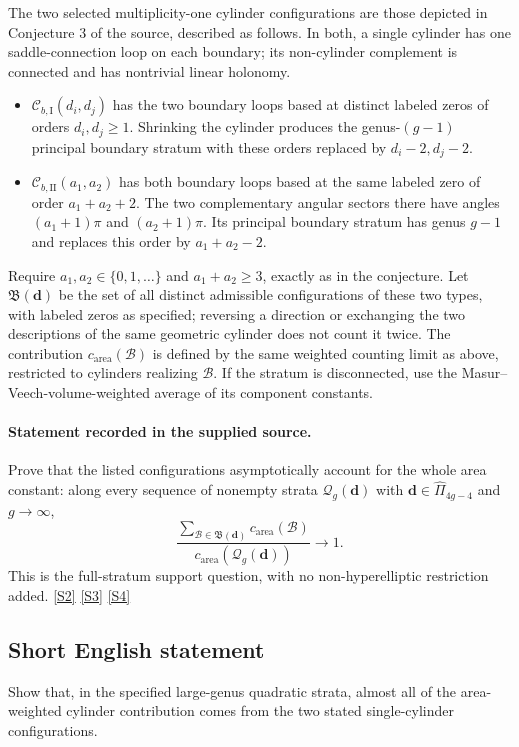 \documentclass[11pt]{article}
\newcommand{\sref}[2]{\hyperlink{source:#1:#2}{[S#2]}}
\begin{document}
The two selected multiplicity-one cylinder configurations are those depicted in Conjecture 3 of the source, described as follows. In both, a single cylinder has one saddle-connection loop on each boundary; its non-cylinder complement is connected and has nontrivial linear holonomy.
\begin{itemize}
\item $\mathcal C_{b,\mathrm I}(d_i,d_j)$ has the two boundary loops based at distinct labeled zeros of orders $d_i,d_j\ge1$. Shrinking the cylinder produces the genus-$(g-1)$ principal boundary stratum with these orders replaced by $d_i-2,d_j-2$.
\item $\mathcal C_{b,\mathrm{II}}(a_1,a_2)$ has both boundary loops based at the same labeled zero of order $a_1+a_2+2$. The two complementary angular sectors there have angles $(a_1+1)\pi$ and $(a_2+1)\pi$. Its principal boundary stratum has genus $g-1$ and replaces this order by $a_1+a_2-2$.
\end{itemize}
Require $a_1,a_2\in\{0,1,\ldots\}$ and $a_1+a_2\ge3$, exactly as in the conjecture. Let $\mathfrak B(\boldsymbol d)$ be the set of all distinct admissible configurations of these two types, with labeled zeros as specified; reversing a direction or exchanging the two descriptions of the same geometric cylinder does not count it twice. The contribution $c_{\mathrm{area}}(\mathcal B)$ is defined by the same weighted counting limit as above, restricted to cylinders realizing $\mathcal B$. If the stratum is disconnected, use the Masur--Veech-volume-weighted average of its component constants.
\paragraph{Statement recorded in the supplied source.}
Prove that the listed configurations asymptotically account for the whole area constant: along every sequence of nonempty strata $\mathcal Q_g(\boldsymbol d)$ with $\boldsymbol d\in\widehat\Pi_{4g-4}$ and $g\to\infty$,
\[
 \frac{\displaystyle\sum_{\mathcal B\in\mathfrak B(\boldsymbol d)}c_{\mathrm{area}}(\mathcal B)}
 {c_{\mathrm{area}}(\mathcal Q_g(\boldsymbol d))}\longrightarrow1.
\]
This is the full-stratum support question, with no non-hyperelliptic restriction added. \sref{statement}{2} \sref{statement}{3} \sref{statement}{4}
\subsection{Short English statement}
Show that, in the specified large-genus quadratic strata, almost all of the area-weighted cylinder contribution comes from the two stated single-cylinder configurations.
\end{document}
